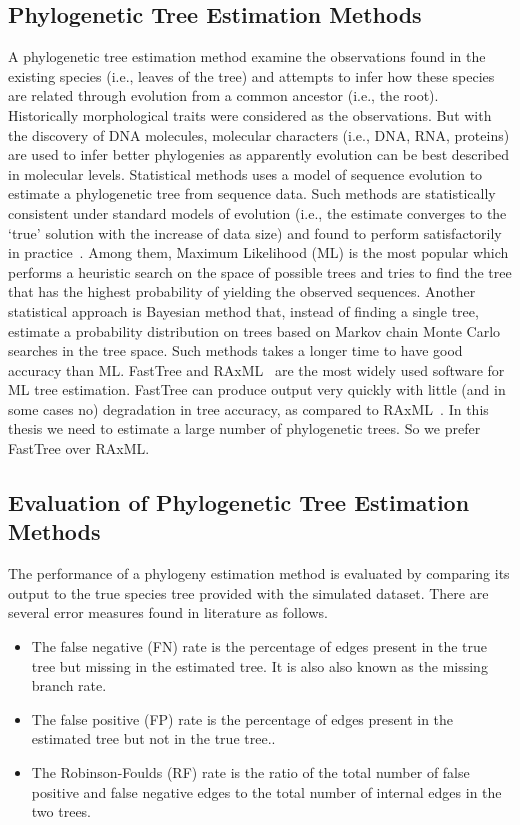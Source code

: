 \subsection{Phylogenetic Tree Estimation Methods}
A phylogenetic tree estimation method examine the observations found in the existing species (i.e., leaves of the tree) and attempts to infer how these species are related through evolution from a common ancestor (i.e., the root). Historically morphological traits were considered as the observations. But with the discovery of DNA molecules, molecular characters (i.e., DNA, RNA, proteins) are used to infer better phylogenies as apparently evolution can be best described in molecular levels. Statistical methods uses a model of sequence evolution to estimate a phylogenetic tree from sequence data. Such methods are statistically consistent under standard models of evolution (i.e., the estimate converges to the `true' solution with the increase of data size) and found to perform satisfactorily in practice~\citep{warnow2017computational}. Among them, Maximum Likelihood (ML) is the most popular which performs a heuristic search on the space of possible trees and tries to find the tree that has the highest probability of yielding the observed sequences. Another statistical approach is Bayesian method that, instead of finding a single tree, estimate a probability distribution on trees  based on Markov chain Monte Carlo searches in the tree space. Such methods takes a longer time to have good accuracy than ML. FastTree\citep{price2010fasttree} and RAxML~\citep{stamatakis2014raxml} are the most widely used software for ML tree estimation. FastTree can produce output very quickly with little (and in some cases no) degradation in tree accuracy, as compared to RAxML~\cite{liu2011raxml}. In this thesis we need to estimate a large number of phylogenetic trees. So we prefer FastTree over RAxML.


\subsection{Evaluation of Phylogenetic Tree Estimation Methods}\label{sec:phyPerf}
The performance of a phylogeny estimation method is evaluated by comparing its output to the true species tree provided with the simulated dataset. There are several error measures found in literature as follows.

\begin{itemize}
	\item The false negative (FN) rate is the percentage of edges present in the true tree but missing in the estimated tree. It is also also known as the missing branch rate.
	\item The false positive (FP) rate is the percentage of edges present in the estimated tree but not in the true tree..
	\item The Robinson-Foulds (RF) rate is the ratio of
the total number of false positive and false negative edges to the total number
	of internal edges in the two trees.
\end{itemize}

